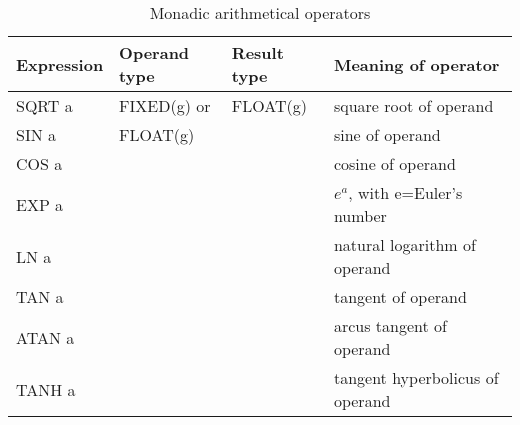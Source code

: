 \begin{table} %
\begin{center}
\caption{Monadic arithmetical operators}
\label{tab_monadic_aritmetic}
\vspace{5mm}
\begin{tabular}{|l|l|l|l|}
\hline 
{\bf Expression} & {\bf Operand type} & {\bf Result type} & {\bf Meaning of operator}\\ \hline
SQRT a
\index{SQRT@\textbf{SQRT}|textbf}
           & FIXED(g) or        & FLOAT(g)          & square root of operand \\ \cline{1-1} \cline{4-4}
SIN a
\index{SIN@\textbf{SIN}|textbf}
            & FLOAT(g)           &                   & sine of operand \\ \cline{1-1} \cline{4-4}
COS a
\index{COS@\textbf{COS}|textbf}
            &                    &                   & cosine of operand \\ \cline{1-1} \cline{4-4}
EXP a
\index{EXP@\textbf{EXP}|textbf}
            &                    &                   & $e^{a}$, with e=Euler's number\\ \cline{1-1} \cline{4-4}
LN a
\index{LN@\textbf{LN}|textbf}
             &                    &                   & natural logarithm of operand\\ \cline{1-1} \cline{4-4}
TAN a
\index{TAN@\textbf{TAN}|textbf}
            &                    &                   & tangent of operand \\ \cline{1-1} \cline{4-4}
ATAN a
\index{ATAN@\textbf{ATAN}|textbf}
           &                    &                   & arcus tangent of operand\\ \cline{1-1} \cline{4-4}
TANH a
\index{TANH@\textbf{TANH}|textbf}
           &                    &                   & tangent hyperbolicus of operand\\
\hline
\end{tabular}
\end{center}
\end{table}

